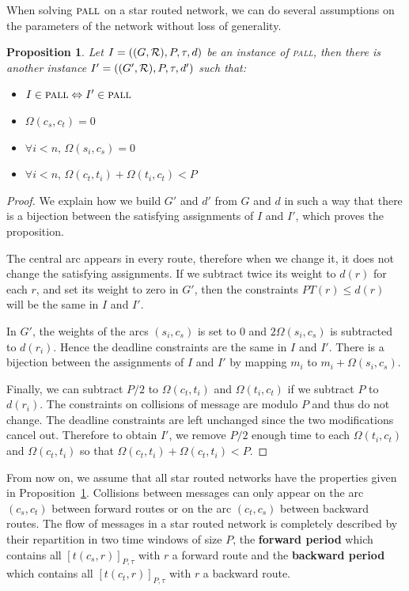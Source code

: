 \documentclass[10pt, conference, letterpaper]{IEEEtran}
\newtheorem{proposition}{Proposition}
\newcommand\pall{\textsc{pall}\xspace}
\begin{document}
	
  When solving $\pall$ on a star routed network, we can do several assumptions on the parameters of the network  without loss of generality. 
  
  \begin{proposition}\label{prop:canonical}
   Let $I = ((G,{\cal R}), P, \tau , d)$ be an instance of \pall, then there is another instance 
   $I' = ((G',{\cal R}), P, \tau , d')$ such that:
   \begin{itemize}
    \item $I \in \pall \Leftrightarrow I' \in \pall$
    \item $\Omega(c_s,c_t) = 0$
    \item $\forall i<n, \, \Omega(s_i,c_s) =0$
    \item $\forall i<n, \, \Omega(c_t,t_i) + \Omega(t_i, c_t) < P$
   \end{itemize}
  \end{proposition}

  \begin{proof}
   We explain how we build $G'$ and $d'$ from $G$ and $d$ in such a way that there is a bijection 
   between the satisfying assignments of $I$ and $I'$, which proves the proposition.
    
  The central arc appears in every route, therefore when we change it, it does not change 
  the satisfying assignments. If we subtract twice its weight to $d(r)$ for each $r$, and set its
  weight to zero in $G'$, then the constraints $PT(r) \leq d(r)$ will be the same in $I$ and $I'$.
      
  In $G'$, the weights of the arcs $(s_i,c_s)$ is set to $0$ and $2\Omega(s_i,c_s)$
  is subtracted to $d(r_i)$. Hence the deadline constraints are the same in $I$ and $I'$.
  There is a bijection between the assignments of $I$ and $I'$ by mapping $m_i$ to $m_i + \Omega(s_i,c_s)$.
  
  Finally, we can subtract $P/2$ to $\Omega(c_t,t_i)$ and $\Omega(t_i,c_t)$ if we subtract $P$ to $d(r_i)$.
  The constraints on collisions of message are modulo $P$ and thus do not change. The deadline constraints are left unchanged since the two modifications cancel out. Therefore to obtain $I'$, we remove $P/2$ enough time to each  $\Omega(t_i,c_t)$ and $\Omega(c_t,t_i)$ so that $\Omega(c_t,t_i) + \Omega(c_t,t_i)< P$. 
  \end{proof}

   From now on, we assume that all star routed networks have the properties given in Proposition~\ref{prop:canonical}.
  Collisions between messages can only appear on the arc $(c_s,c_t)$ between forward routes or on the arc $(c_t,c_s)$
  between backward routes. The flow of messages in a star routed network is completely described by their repartition in two time windows of size $P$, the {\bf forward period} which contains all $[t(c_s,r)]_{P,\tau}$ with $r$ a forward route and the {\bf backward period} which contains all $[t(c_t,r)]_{P,\tau}$ with $r$ a backward route.
\end{document}
